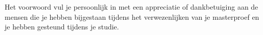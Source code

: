 Het voorwoord vul je persoonlijk in met een appreciatie of dankbetuiging aan de mensen die je hebben bijgestaan tijdens het verwezenlijken van je masterproef en je hebben gesteund tijdens je studie.